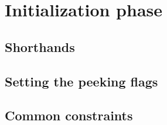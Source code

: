 
\section{Initialization phase         \lispTodo{}}
\subsection{Shorthands                \lispTodo{}}   \label{hub: initialization phase: shorthands}               
\subsection{Setting the peeking flags \lispTodo{}}   \label{hub: initialization phase: setting peeking flags}    
\subsection{Common constraints        \lispTodo{}}   \label{hub: initialization phase: common constraints}       

